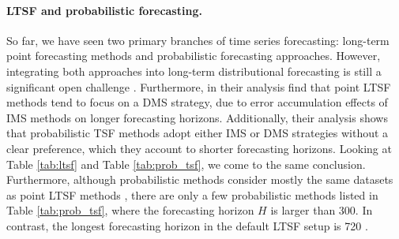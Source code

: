 \documentclass[a4paper,oneside,bibliography=totoc]{scrbook}
\begin{document}
\paragraph{LTSF and probabilistic forecasting.}
So far, we have seen two primary branches of time series forecasting: long-term point forecasting methods and probabilistic forecasting approaches.
However, integrating both approaches into long-term distributional forecasting is still a significant open challenge \cite{zhang_probts_2024}.
Furthermore, in their analysis \citet{zhang_probts_2024} find that point LTSF methods tend to focus on a DMS strategy, due to error accumulation effects of IMS methods on longer forecasting horizons.
Additionally, their analysis shows that probabilistic TSF methods adopt either IMS or DMS strategies without a clear preference, which they account to shorter forecasting horizons.
Looking at Table \ref{tab:ltsf} and Table \ref{tab:prob_tsf}, we come to the same conclusion.
Furthermore, although probabilistic methods consider mostly the same datasets as point LTSF methods \cite{kollovieh_predict_2023, rasul_vq-tr_2023, drouin_tactis_2022, tong_probabilistic_2022}, there are only a few probabilistic methods listed in Table \ref{tab:prob_tsf}, where the forecasting horizon $H$ is larger than 300. 
In contrast, the longest forecasting horizon in the default LTSF setup is 720 \cite{zhou_informer_2021}.
\end{document}

